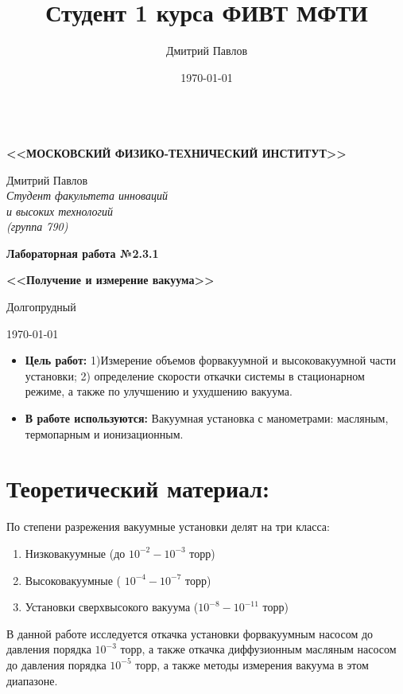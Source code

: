 \documentclass[a4paper,12pt]{article}
\author{Дмитрий Павлов}
\title{Студент 1 курса ФИВТ МФТИ}
\date{\today}
\theoremstyle{plain} %
\theoremstyle{definition} %
\theoremstyle{remark} %
\begin{document}

\thispagestyle{empty}
\begin{center}
	\vspace{0.5ex}
	
	\textbf{ \\ \MakeTextUppercase{<<Московский Физико-технический институт>>}}
\end{center}
\vspace{13ex}
\begin{flushright}
	\noindent
	{Дмитрий Павлов}
	\\
	\textit{Студент факультета инноваций\\ и высоких технологий\\(группа 790)}
\end{flushright}
\begin{center}
	\vspace{23ex}
	{\LARGE\textbf{Лабораторная работа №2.3.1}}
	\vspace{1ex}
		
	\textbf{\large{<<Получение и измерение вакуума>>}}
	
	\vfill
	Долгопрудный 
	
	{\today}
\end{center}


\newpage
\begin{itemize}
\item
\large
\textbf{Цель работ:} 1)Измерение объемов форвакуумной и высоковакуумной части установки; 2) определение скорости откачки системы в стационарном режиме, а также по улучшению и ухудшению вакуума.

\item
\large
\textbf{В работе используются:} Вакуумная установка с манометрами: масляным, термопарным и ионизационным.
\end{itemize}
\section{Теоретический материал:}
По степени разрежения вакуумные установки делят на три класса:
\begin{enumerate}
\item
Низковакуумные (до $10^{-2} - 10^{-3}$ торр)
\item
Высоковакуумные ( $10^{-4} - 10^{-7}$ торр)
\item
Установки сверхвысокого вакуума ($10^{-8} - 10^{-11}$ торр)
\end{enumerate}
В данной работе исследуется откачка установки форвакуумным насосом до давления порядка $10^{-3}$ торр, а также откачка диффузионным масляным насосом до давления порядка $10^{-5}$ торр, а также методы измерения вакуума в этом диапазоне.
\end{document}
